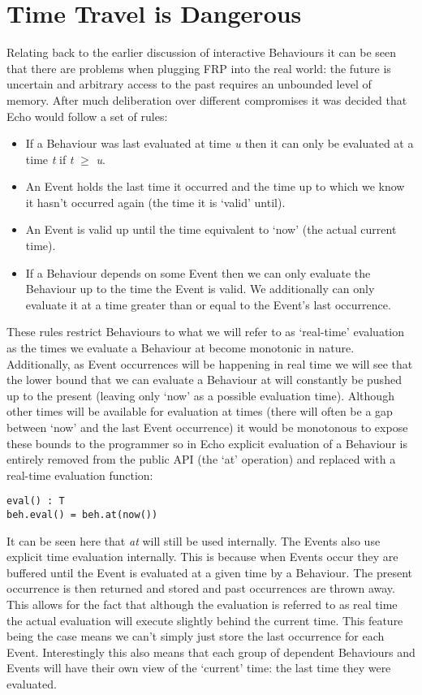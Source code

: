   \section{Time Travel is Dangerous}
    Relating back to the earlier discussion of interactive Behaviours it can be seen
    that there are problems when plugging FRP into the real world: the future is uncertain and
    arbitrary access to the past requires an unbounded level of memory. After much deliberation
    over different compromises it was decided that Echo would follow a set of rules:
    
    \begin{itemize}
      \item If a Behaviour was last evaluated at time \emph{u} then it can only be evaluated at
      a time \emph{t} if \emph{t} $\geq$ \emph{u}.
      \item An Event holds the last time it occurred and the time up to which we know it hasn't occurred
      again (the time it is `valid' until).
      \item An Event is valid up until the time equivalent to `now' (the actual current time).
      \item If a Behaviour depends on some Event then we can only evaluate the Behaviour up to
      the time the Event is valid. We additionally can only evaluate it at a time greater than
      or equal to the Event's last occurrence.
    \end{itemize}
    
    These rules restrict Behaviours to what we will refer to as `real-time' evaluation as the times
    we evaluate a Behaviour at become monotonic in nature. Additionally, as Event occurrences will
    be happening in real time we will see that the lower bound that we can evaluate a Behaviour at will
    constantly be pushed up to the present (leaving only `now' as a possible evaluation time). Although
    other times will be available for evaluation at times (there will often be a gap between `now' and
    the last Event occurrence) it would be monotonous to expose these bounds to the programmer so
    in Echo explicit evaluation of a Behaviour is entirely removed from the public API (the
    `at' operation) and replaced with a real-time evaluation function:

\begin{verbatim}
eval() : T
beh.eval() = beh.at(now())
\end{verbatim}  

    It can be seen here that \emph{at} will still be used internally. The Events also use explicit time
    evaluation internally. This is because when Events occur they are buffered until the Event is
    evaluated at a given time by a Behaviour. The present occurrence is then returned and stored and past occurrences
    are thrown away. This allows for the fact that although the evaluation is referred to as real time the
    actual evaluation will execute slightly behind the current time. This feature being the
    case means we can't simply just store the last occurrence for each Event. Interestingly this also
    means that each group of dependent Behaviours and Events will have their own view of the `current' time:
    the last time they were evaluated.

